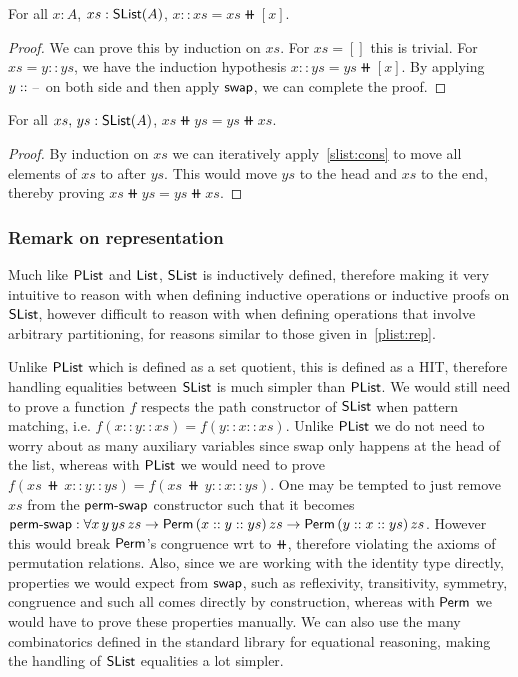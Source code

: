 \begin{lemma}\label{slist:cons}
    For all $x : A$, $xs : \operatorname{\mathsf{SList}}(A)$, $x :: xs = xs \doubleplus [ x ]$.
\end{lemma}

\begin{proof}
    We can prove this by induction on $xs$.
    For $xs = []$ this is trivial. For $xs = y :: ys$, we have the induction hypothesis $x :: ys = ys \doubleplus [ x ]$.
    By applying $y :: {\scriptstyle{-}}$ on both side and then apply $\operatorname{\mathsf{swap}}$, we can complete the proof.
\end{proof}

\begin{theorem}[Commutativity]\label{slist:comm}
    For all $xs,\,ys : \operatorname{\mathsf{SList}}(A)$, $xs \doubleplus ys = ys \doubleplus xs$.
\end{theorem}

\begin{proof}
    By induction on $xs$ we can iteratively apply~\cref{slist:cons} to move all elements of $xs$
    to after $ys$. This would move $ys$ to the head and $xs$ to the end, thereby proving
    $xs \doubleplus ys = ys \doubleplus xs$.
\end{proof}

\subsubsection*{Remark on representation}\label{slist:rep}
Much like $\operatorname{\mathsf{PList}}$ and $\operatorname{\mathsf{List}}$, $\operatorname{\mathsf{SList}}$ is inductively defined, therefore making it very intuitive to reason
with when defining inductive operations or inductive proofs on $\operatorname{\mathsf{SList}}$, however difficult to reason with
when defining operations that involve arbitrary partitioning, for reasons similar to those given
in~\cref{plist:rep}.

Unlike $\operatorname{\mathsf{PList}}$ which is defined as a set quotient, this is defined as a HIT, therefore handling equalities
between $\operatorname{\mathsf{SList}}$ is much simpler than $\operatorname{\mathsf{PList}}$. We would still need to prove a function $f$ respects
the path constructor of $\operatorname{\mathsf{SList}}$ when pattern matching, i.e. $f(x :: y :: xs) = f(y :: x :: xs)$.
Unlike $\operatorname{\mathsf{PList}}$ we do not need to worry about as many auxiliary variables since swap
only happens at the head of the list, whereas with $\operatorname{\mathsf{PList}}$ we would need to prove
$f(xs\,\doubleplus\,x :: y :: ys) = f(xs\,\doubleplus\,y :: x :: ys)$. One may be tempted to just remove $xs$
from the $\operatorname{\mathsf{perm-swap}}$ constructor such that it becomes
$\operatorname{\mathsf{perm-swap}} : \forall x\,y\,ys\,zs \to \operatorname{\mathsf{Perm}}\,(x :: y :: ys)\,zs \to \operatorname{\mathsf{Perm}}\,(y :: x :: ys)\,zs$.
However this would break $\operatorname{\mathsf{Perm}}$'s congruence wrt to $\doubleplus$, therefore violating the axioms of
permutation relations. Also, since we are working with the identity type directly, properties we would
expect from $\operatorname{\mathsf{swap}}$, such as reflexivity, transitivity, symmetry, congruence and such all comes directly by
construction, whereas with $\operatorname{\mathsf{Perm}}$ we would have to prove these properties manually.
We can also use the many combinatorics defined in the standard library for equational reasoning,
making the handling of $\operatorname{\mathsf{SList}}$ equalities a lot simpler.

